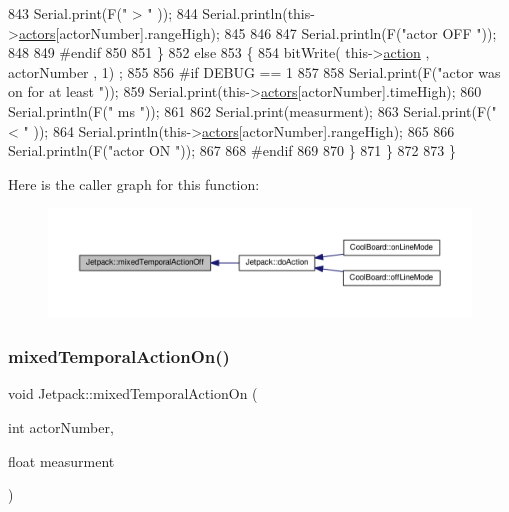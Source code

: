 \begin{DoxyCode}
843             Serial.print(F(\textcolor{stringliteral}{" > "} ));
844             Serial.println(this->\hyperlink{class_jetpack_a7e16d2f97837f9712a2e6de1c50d99db}{actors}[actorNumber].rangeHigh);
845 
846             
847             Serial.println(F(\textcolor{stringliteral}{"actor OFF "}));
848 
849 \textcolor{preprocessor}{        #endif}
850 
851         \}
852         \textcolor{keywordflow}{else} 
853         \{
854             bitWrite( this->\hyperlink{class_jetpack_aca3142925a7b0834b34ae91d26af7765}{action} , actorNumber , 1) ;
855 
856 \textcolor{preprocessor}{        #if DEBUG == 1 }
857             
858             Serial.print(F(\textcolor{stringliteral}{"actor was on for at least "}));
859             Serial.print(this->\hyperlink{class_jetpack_a7e16d2f97837f9712a2e6de1c50d99db}{actors}[actorNumber].timeHigh);
860             Serial.println(F(\textcolor{stringliteral}{" ms "}));
861 
862             Serial.print(measurment);
863             Serial.print(F(\textcolor{stringliteral}{" < "} ));
864             Serial.println(this->\hyperlink{class_jetpack_a7e16d2f97837f9712a2e6de1c50d99db}{actors}[actorNumber].rangeHigh);
865 
866             Serial.println(F(\textcolor{stringliteral}{"actor ON "}));
867 
868 \textcolor{preprocessor}{        #endif              }
869 
870         \}           
871     \}
872 
873 \}
\end{DoxyCode}
Here is the caller graph for this function\+:\nopagebreak
\begin{figure}[H]
\begin{center}
\leavevmode
\includegraphics[width=350pt]{df/d1d/class_jetpack_af2f567ef6311a8fc2f7bb948837667b7_icgraph}
\end{center}
\end{figure}
\mbox{\label{class_jetpack_af44bc8a08818e4433dfb1c7104601f12}} 
\subsubsection{\texorpdfstring{mixed\+Temporal\+Action\+On()}{mixedTemporalActionOn()}}
{\footnotesize\ttfamily void Jetpack\+::mixed\+Temporal\+Action\+On (\begin{DoxyParamCaption}\item[{int}]{actor\+Number,  }\item[{float}]{measurment }\end{DoxyParamCaption})}

